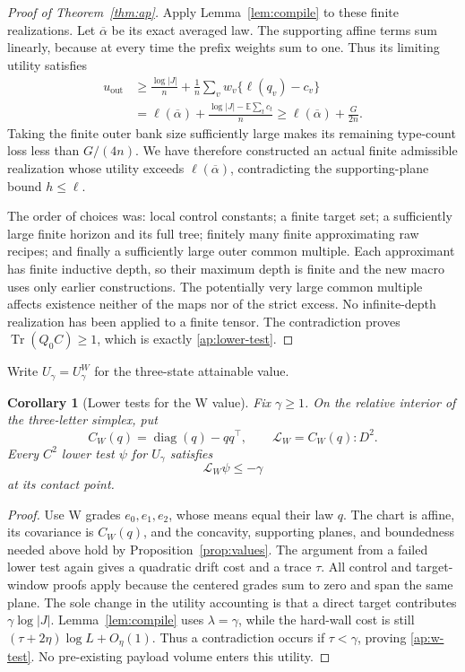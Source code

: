 \documentclass[11pt]{article}
\numberwithin{equation}{section}
\newtheorem{corollary}[theorem]{Corollary}
\theoremstyle{definition}
\theoremstyle{remark}
\newcommand{\E}{\mathbb E}
\DeclareMathOperator{\Tr}{Tr}
\DeclareMathOperator{\diag}{diag}
\begin{document}
\begin{proof}[Proof of Theorem~\ref{thm:ap}]
Apply Lemma~\ref{lem:compile} to these finite realizations.  Let
\(\overline\alpha\) be its exact averaged law.  The supporting affine
terms sum linearly, because at every time the prefix weights sum to one.
Thus its limiting utility satisfies
\begin{align*}
 u_{\mathrm{out}}
 &\geq\frac{\log|J|}n
   +\frac1n\sum_v w_v\{\ell(q_v)-c_v\}\\
 &=\ell(\overline\alpha)
   +\frac{\log|J|-\E\sum_t c_t}{n}
 \geq\ell(\overline\alpha)+\frac{G}{2n}.
\end{align*}
Taking the finite outer bank size sufficiently large makes its remaining
type-count loss less than \(G/(4n)\).  We have therefore constructed
an actual finite admissible realization whose utility exceeds
\(\ell(\overline\alpha)\), contradicting the supporting-plane bound
\(h\leq\ell\).

The order of choices was: local control constants; a finite target set;
a sufficiently large finite horizon and its full tree; finitely many
finite approximating raw recipes; and finally a sufficiently large outer
common multiple.  Each approximant has finite inductive depth, so their
maximum depth is finite and the new macro uses only earlier constructions.
The potentially very large common multiple affects existence neither
of the maps nor of the strict excess.  No infinite-depth realization has
been applied to a finite tensor.  The contradiction proves
\(\Tr(Q_0C)\geq1\), which is exactly \eqref{ap:lower-test}.
\end{proof}

Write \(U_\gamma=U^W_\gamma\) for the three-state attainable value.

\begin{corollary}[Lower tests for the W value]\label{cor:w-ap}
Fix \(\gamma\geq1\).  On the relative interior of the three-letter
simplex, put
\[
 C_W(q)=\diag(q)-qq^\top,
 \qquad \mathcal L_W=C_W(q):D^2.
\]
Every \(C^2\) lower test \(\psi\) for \(U_\gamma\) satisfies
\begin{equation}\label{ap:w-test}
 \mathcal L_W\psi\leq-\gamma
\end{equation}
at its contact point.
\end{corollary}

\begin{proof}
Use W grades \(e_0,e_1,e_2\), whose means equal their law \(q\).
The chart is affine, its covariance is \(C_W(q)\), and the concavity,
supporting planes, and boundedness needed above hold by
Proposition~\ref{prop:values}.  The argument from a failed lower test
again gives a quadratic drift cost and a trace \(\tau\).  All control
and target-window proofs apply because the centered grades sum to zero
and span the same plane.  The sole change in the utility accounting is
that a direct target contributes \(\gamma\log|J|\).  Lemma~\ref{lem:compile}
uses \(\lambda=\gamma\), while the hard-wall cost is still
\((\tau+2\eta)\log L+O_\eta(1)\).  Thus a contradiction occurs if
\(\tau<\gamma\), proving \eqref{ap:w-test}.  No pre-existing payload
volume enters this utility.
\end{proof}
\end{document}
